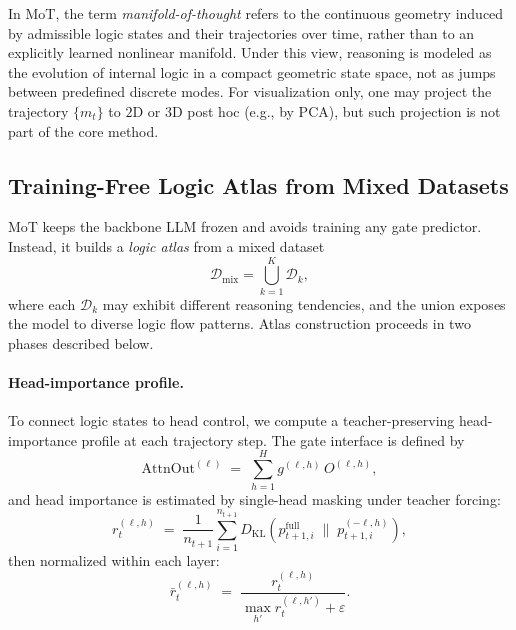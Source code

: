 \documentclass{article}
\newcommand{\eps}{\varepsilon}
\begin{document}
In MoT, the term \emph{manifold-of-thought} refers to the continuous geometry induced by admissible logic states and their trajectories over time, rather than to an explicitly learned nonlinear manifold. Under this view, reasoning is modeled as the evolution of internal logic in a compact geometric state space, not as jumps between predefined discrete modes. 
For visualization only, one may project the trajectory $\{m_t\}$ to $2$D or $3$D post hoc (e.g., by PCA), but such projection is not part of the core method.

\subsection{Training-Free Logic Atlas from Mixed Datasets}
\label{sec:controller}

MoT keeps the backbone LLM frozen and avoids training any gate predictor. Instead, it builds a \emph{logic atlas} from a mixed dataset
\[
\mathcal{D}_{\mathrm{mix}}=\bigcup_{k=1}^{K}\mathcal{D}_k,
\]
where each $\mathcal{D}_k$ may exhibit different reasoning tendencies, and the union exposes the model to diverse logic flow patterns. Atlas construction proceeds in two phases described below.

\paragraph{Head-importance profile.}
To connect logic states to head control, we compute a teacher-preserving head-importance profile at each trajectory step. The gate interface is defined by
\begin{equation}
\mathrm{AttnOut}^{(\ell)} \;=\; \sum_{h=1}^{H} g^{(\ell,h)} \, O^{(\ell,h)},
\label{eq:headout}
\end{equation}
and head importance is estimated by single-head masking under teacher forcing:
\begin{equation}
r_{t}^{(\ell,h)}
\;=\;
\frac{1}{n_{t+1}}
\sum_{i=1}^{n_{t+1}}
D_{\mathrm{KL}}
\!\left(
p^{\mathrm{full}}_{t+1,i}
\;\|\;
p^{(-\ell,h)}_{t+1,i}
\right),
\label{eq:teacher_importance}
\end{equation}
then normalized within each layer:
\begin{equation}
\bar r_{t}^{(\ell,h)}
\;=\;
\frac{r_{t}^{(\ell,h)}}
{\max_{h'} r_{t}^{(\ell,h')} + \eps}.
\label{eq:teacher_importance_norm}
\end{equation}
\end{document}
